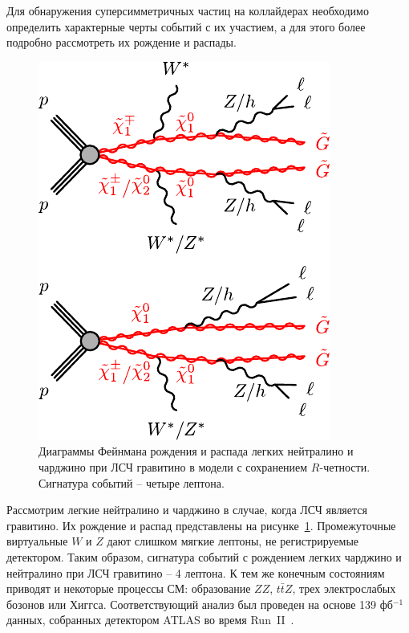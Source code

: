\documentclass[a4paper, 10pt, twocolumn]{article}
\begin{document}
Для обнаружения суперсимметричных частиц на коллайдерах необходимо 
определить характерные черты событий с их участием, а для этого более 
подробно рассмотреть их рождение и распады.


\begin{figure}[b!]%
	\centering
	\includegraphics[width=.7\linewidth]{figures/4lepton-Feynman}
	\caption{Диаграммы Фейнмана рождения и распада легких нейтралино 
	и чарджино при ЛСЧ гравитино в модели с сохранением $R$-четности. 
	Сигнатура событий -- четыре лептона.}
	\label{fig:chi12-gravitino}
\end{figure}%

Рассмотрим легкие нейтралино и чарджино в случае, когда ЛСЧ 
является гравитино. Их рождение и распад представлены на 
рисунке~\ref{fig:chi12-gravitino}. Промежуточные виртуальные $W$ и $Z$ 
дают слишком мягкие лептоны, не регистрируемые детектором. Таким 
образом, сигнатура событий с рождением легких чарджино и нейтралино при 
ЛСЧ гравитино -- 4 лептона. К тем же конечным состояниям приводят 
и некоторые процессы СМ: образование $ZZ$, $t\bar{t}Z$, трех 
электрослабых бозонов или Хиггса. Соответствующий анализ был проведен 
на основе 139 фб$^{-1}$ данных, собранных детектором ATLAS во время 
Run~II~\cite{ATLAS-CONF-2020-040}.
\end{document}
